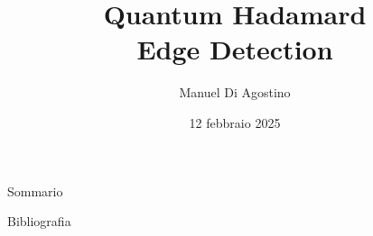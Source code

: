 \documentclass{beamer}
\title{Quantum Hadamard\\Edge Detection}
\author{Manuel Di Agostino}
\institute{Università di Parma}
\date{12 febbraio 2025}
\begin{document}
	\begin{frame}
		\titlepage
	\end{frame}
	\begin{frame}{Sommario}
		\tableofcontents
	\end{frame}
	
	
	
	


	\begin{frame}[allowframebreaks]{Bibliografia}
		\printbibliography
	\end{frame}
\end{document}
